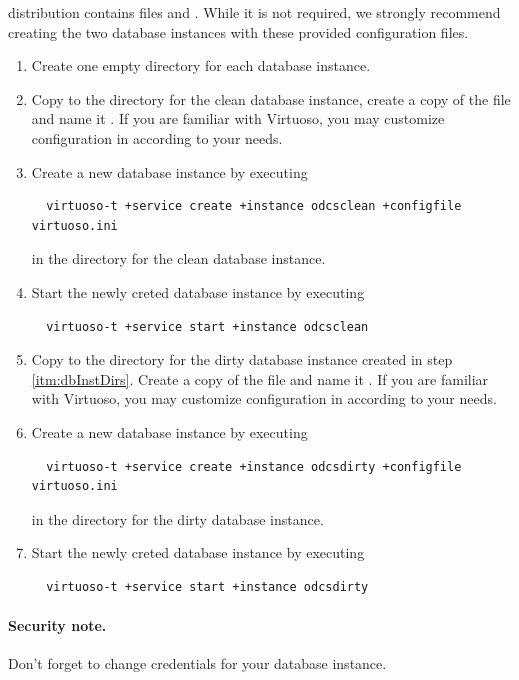 \odcs distribution contains files  and . While it is not required, we strongly recommend creating the two database instances with these provided configuration files.

\begin{enumerate}
  \item \label{itm:dbInstDirs} Create one empty directory for each database instance.
  \item \label{itm:dbInstCleanStart} Copy  to the directory for the clean database instance, create a copy of the file and name it . If you are familiar with Virtuoso, you may customize configuration in  according to your needs. 
  \item Create a new database instance by executing
\begin{verbatim}
  virtuoso-t +service create +instance odcsclean +configfile virtuoso.ini
\end{verbatim}
    in the directory for the clean database instance.
    \item \label{itm:dbInstCleanEnd} Start the newly creted database instance by executing
\begin{verbatim}
  virtuoso-t +service start +instance odcsclean
\end{verbatim}
  
  \item Copy  to the directory for the dirty database instance created in step \ref{itm:dbInstDirs}. Create a copy of the file and name it . If you are familiar with Virtuoso, you may customize configuration in  according to your needs. 
  \item Create a new database instance by executing
\begin{verbatim}
  virtuoso-t +service create +instance odcsdirty +configfile virtuoso.ini
\end{verbatim}
    in the directory for the dirty database instance.
    \item  Start the newly creted database instance by executing
\begin{verbatim}
  virtuoso-t +service start +instance odcsdirty
\end{verbatim}
\end{enumerate}


\paragraph{Security note.} Don't forget to change credentials for your database instance.

